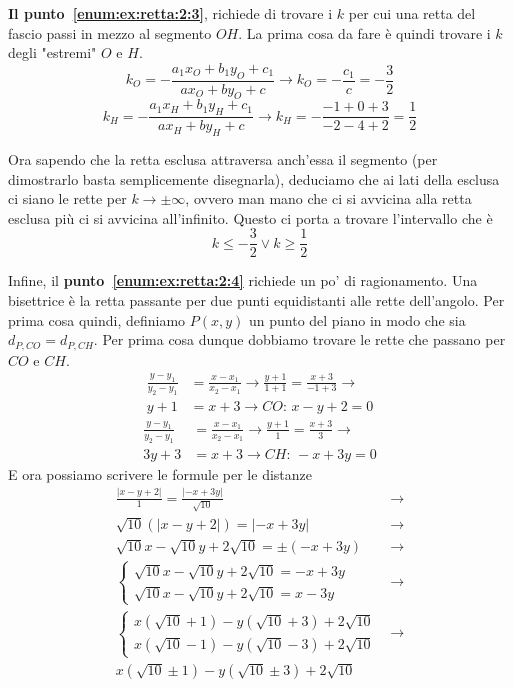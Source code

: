 \textbf{Il punto~\ref{enum:ex:retta:2:3}}, richiede di trovare i $k$ per cui una retta del fascio 
passi in mezzo al segmento $OH$. La prima cosa da fare è quindi trovare i $k$ degli "estremi" $O$ e
$H$.
\begin{equation*}
k_O = -\frac{a_1x_O+b_1y_O+c_1}{ax_O+by_O+c} \rightarrow k_O = -\frac{c_1}{c} = -\frac{3}{2}
\end{equation*}
\begin{equation*}
k_H = -\frac{a_1x_H+b_1y_H+c_1}{ax_H+by_H+c} \rightarrow k_H = -\frac{-1+0+3}{-2-4+2} = \frac{1}{2}
\end{equation*}

Ora sapendo che la retta esclusa attraversa anch'essa il segmento (per dimostrarlo basta 
semplicemente disegnarla), deduciamo che ai lati della esclusa ci siano le rette per $k\to\pm\infty$,
ovvero man mano che ci si avvicina alla retta esclusa più ci si avvicina all'infinito. Questo ci porta
a trovare l'intervallo che è
\begin{equation*}
\boxed{k\leq-\frac{3}{2} \vee k\geq\frac{1}{2}}
\end{equation*}

Infine, il \textbf{punto~\ref{enum:ex:retta:2:4}} richiede un po' di ragionamento. Una bisettrice è la
retta passante per due punti equidistanti alle rette dell'angolo. Per prima cosa quindi, definiamo
$P(x,y)$ un punto del piano in modo che sia $d_{P,CO} = d_{P,CH}$. Per prima cosa dunque dobbiamo 
trovare le rette che passano per $CO$ e $CH$.
\begin{align*}
\frac{y-y_1}{y_2-y_1} &= \frac{x-x_1}{x_2-x_1} \rightarrow
\frac{y+1}{1+1} = \frac{x+3}{-1+3} \rightarrow\\
y+1 &= x+3 \rightarrow CO:\, x-y+2 = 0
\end{align*}
\begin{align*}
\frac{y-y_1}{y_2-y_1} &= \frac{x-x_1}{x_2-x_1} \rightarrow
\frac{y+1}{1}= \frac{x+3}{3} \rightarrow\\
3y+3 &= x+3 \rightarrow CH:\, -x+3y=0
\end{align*}
E ora possiamo scrivere le formule per le distanze
\begin{align*}
\frac{\lvert x-y+2\rvert}{1} = \frac{\lvert -x+3y\rvert}{\sqrt{10}} &\rightarrow\\
\sqrt{10}(\lvert x-y+2\rvert) = \lvert -x+3y\rvert &\rightarrow\\
\sqrt{10}x-\sqrt{10}y+2\sqrt{10} = \pm(-x+3y) &\rightarrow\\
\begin{cases}
\sqrt{10}x-\sqrt{10}y+2\sqrt{10} = -x+3y\\
\sqrt{10}x-\sqrt{10}y+2\sqrt{10} = x-3y
\end{cases} &\rightarrow\\
\begin{cases}
x(\sqrt{10}+1)-y(\sqrt{10}+3) + 2\sqrt{10}\\
x(\sqrt{10}-1)-y(\sqrt{10}-3) + 2\sqrt{10}
\end{cases} &\rightarrow\\
\boxed{x(\sqrt{10}\pm1)-y(\sqrt{10}\pm3)+2\sqrt{10}}
\end{align*}

